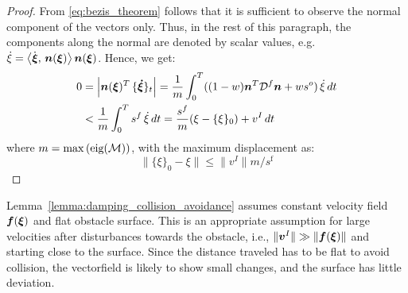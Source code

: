 \begin{proof}
From \eqref{eq:bezis_theorem} follows that it is sufficient to observe the normal component of the vectors only. Thus, in the rest of this paragraph, the components along the normal are denoted by scalar values, e.g. $\dot \xi = \left\langle {\dot{\boldsymbol{\xi}}}, \, {\boldsymbol{n}(\boldsymbol{\xi})} \right\rangle \boldsymbol{n}(\boldsymbol{\xi})$.
Hence, we get:
\begin{align}
	0 & = \left| \boldsymbol{n}(\boldsymbol{\xi})^T \, \{ \boldsymbol{\dot \xi} \}_{t} \right| 
	  = \frac 1 m \int_0^T ( (1-w) \boldsymbol{n}^T \mathcal{D}^f \boldsymbol{n} + w s^{o} ) \, {\dot \xi} \, dt \nonumber \\
	   & < \frac 1 m \int_0^T  s^{f}  \, {\dot \xi} \, dt 
	   = \frac{s^f}{m} (\xi - \{ \xi \}_0 ) + v^I \, dt 
\end{align}
where $m = \max{\left(\text{eig}(\mathcal{M})\right)}$, with the maximum displacement as:
\begin{equation}
	\| \{\xi \}_0 - {\xi} \| \leq \| v^I \| {m} / {s^{\mathrm{f}}} 
\end{equation}
\end{proof}

Lemma~\ref{lemma:damping_collision_avoidance} assumes constant velocity field $\boldsymbol{f}(\boldsymbol{\xi})$ and flat obstacle surface. This is an appropriate assumption for large velocities after disturbances towards the obstacle, i.e., $\| \boldsymbol{v}^I \| \gg \| \boldsymbol{f}(\boldsymbol{\xi}) \|$ and starting close to the surface. Since the distance traveled has to be flat to avoid collision, the vectorfield is likely to show small changes, and the surface has little deviation. 

